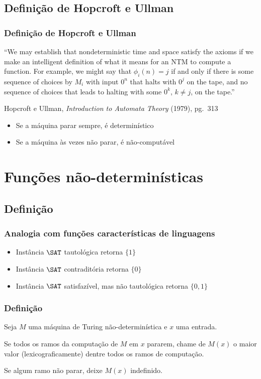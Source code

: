 \documentclass[utf8,notheorems]{beamer}
\theoremstyle{definition}
\begin{document}
\subsection{Definição de Hopcroft e Ullman}
\begin{frame}
    \frametitle{Definição de Hopcroft e Ullman}
    ``We may establish that nondeterministic time and space
    satisfy the axioms if we make an intelligent definition of what it means
    for an NTM to compute a function.
    For example, we might say that $\phi_i(n) = j$
    if and only if there is some sequence of choices by $M_i$ with input $0^n$
    that halts with $0^j$ on the tape,
    and no sequence of choices that leads to halting with some $0^k$, $k \neq j$,
    on the tape.''

    {\scriptsize
        Hopcroft e Ullman, \emph{Introduction to Automata Theory} (1979), pg.~313
    }

    \pause
    \begin{itemize}
        \item Se a máquina parar sempre, é determinístico
        \item Se a máquina às vezes não parar, é não-computável
    \end{itemize}
\end{frame}

\section{Funções não-determinísticas}

\subsection{Definição}
\begin{frame}
    \frametitle{Analogia com funções características de linguagens}
    \begin{itemize}
        \item Instância $\SAT$ tautológica retorna $\{1\}$
        \item Instância $\SAT$ contraditória retorna $\{0\}$
        \item Instância $\SAT$ satisfazível, mas não tautológica retorna $\{0, 1\}$
    \end{itemize}
\end{frame}
\begin{frame}
    \frametitle{Definição}
    Seja $M$ uma máquina de Turing não-determinística
    e $x$ uma entrada.

    Se todos os ramos da computação de $M$ em $x$ pararem,
    chame de $M(x)$ o maior valor
    (lexicograficamente)
    dentre todos os ramos de computação.

    Se algum ramo não parar,
    deixe $M(x)$ indefinido.
\end{frame}
\end{document}
